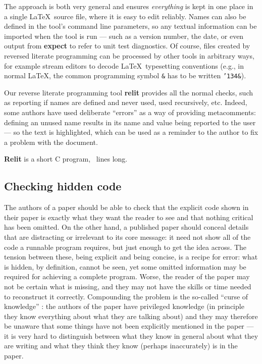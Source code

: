 \documentclass[12pt]{article}
\def\name#1{\textbf{#1}}
\begin{document}
The approach is both very general and ensures \emph{everything\/} is kept in one place in a single \LaTeX\ source file, where it is easy to edit reliably. Names can also be defined in the tool's command line parameters, so any textual information can be imported when the tool is run --- such as a version number, the date, or even output from \name{expect} to refer to unit test diagnostics. Of course, files created by reversed literate programming can be processed by other tools in arbitrary ways, for example stream editors to decode \LaTeX\ typesetting conventions (e.g., in normal \LaTeX, the common programming symbol \texttt{\&} has to be written \texttt{\char'134\&}).

Our reverse literate programming tool \name{relit} provides all the normal checks, such as reporting if names are defined and never used, used recursively, etc. 
Indeed, some authors have used deliberate ``errors'' as a way of providing metacomments: defining an unused name results in its name and value being reported to the user --- so the text is highlighted, which can be used as a reminder to the author to fix a problem with the document. 

\name{Relit} is a short C program, \ lines long.

\subsection{Checking hidden code}\label{invisible-code}
\def\seen{\color{black}\ttfamily\fontseries{l}\selectfont\global\def\endline{}}
\def\hidden{\ttfamily\fontseries{b}\selectfont\emph{$\ast\ast\ast$ hidden $\ast\ast\ast$}}
\def\unseen{\color{highlight-color}\ttfamily\fontseries{b}\selectfont\global\def\endline{\hfill~~\hidden}}

The authors of a paper should be able to check that the explicit code shown in their paper is exactly what they want the reader to see and that nothing critical has been omitted. On the other hand, a published paper should conceal details that are distracting or irrelevant to its core message: it need not show all of the code a runnable program requires, but just enough to get the idea across. The tension between these, being explicit and being concise, is a recipe for error: what is hidden, by definition, cannot be seen, yet some omitted information may be required for achieving a complete program. Worse, the reader of the paper may not be certain what is missing, and they may not have the skills or time needed to reconstruct it correctly. Compounding the problem is the so-called ``curse of knowledge'' \cite{pinker}: the authors of the paper have privileged knowledge (in principle they know everything about what they are talking about) and they may therefore be unaware that some things have not been explicitly mentioned in the paper --- it is very hard to distinguish between what they know in general about what they are writing and what they think they know (perhaps inaccurately) is in the paper.
\end{document}
